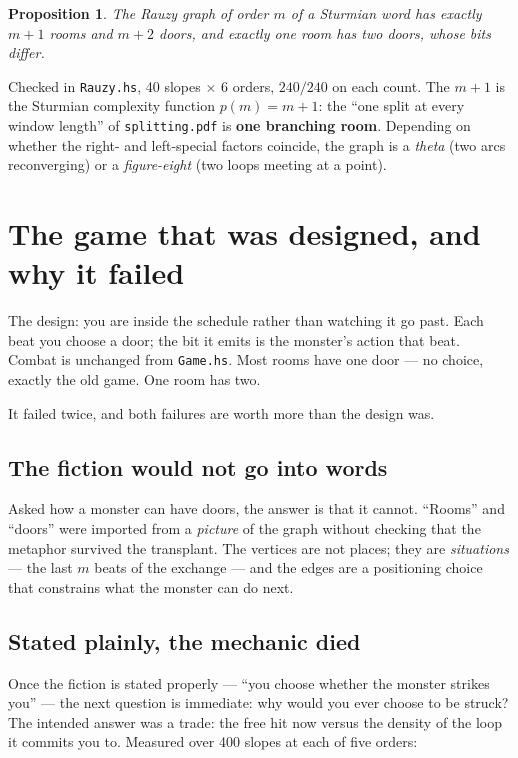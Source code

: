 \documentclass[11pt,a4paper]{article}
\theoremstyle{definition}
\theoremstyle{plain}
\newtheorem{proposition}[definition]{Proposition}
\theoremstyle{remark}
\begin{document}
\begin{proposition}\label{prop:necklace}
The Rauzy graph of order $m$ of a Sturmian word has exactly $m+1$ rooms and
$m+2$ doors, and exactly one room has two doors, whose bits differ.
\end{proposition}

Checked in \texttt{Rauzy.hs}, 40 slopes $\times$ 6 orders, $240/240$ on each
count. The $m+1$ is the Sturmian complexity function $p(m) = m+1$: the ``one
split at every window length'' of \texttt{splitting.pdf} is \textbf{one
branching room}. Depending on whether the right- and left-special factors
coincide, the graph is a \emph{theta} (two arcs reconverging) or a
\emph{figure-eight} (two loops meeting at a point).

\section{The game that was designed, and why it failed}

The design: you are inside the schedule rather than watching it go past. Each
beat you choose a door; the bit it emits is the monster's action that beat.
Combat is unchanged from \texttt{Game.hs}. Most rooms have one door --- no
choice, exactly the old game. One room has two.

It failed twice, and both failures are worth more than the design was.

\subsection{The fiction would not go into words}

Asked how a monster can have doors, the answer is that it cannot. ``Rooms'' and
``doors'' were imported from a \emph{picture} of the graph without checking that
the metaphor survived the transplant. The vertices are not places; they are
\emph{situations} --- the last $m$ beats of the exchange --- and the edges are a
positioning choice that constrains what the monster can do next.

\subsection{Stated plainly, the mechanic died}

Once the fiction is stated properly --- ``you choose whether the monster strikes
you'' --- the next question is immediate: why would you ever choose to be
struck? The intended answer was a trade: the free hit now versus the density of
the loop it commits you to. Measured over 400 slopes at each of five orders:
\end{document}
